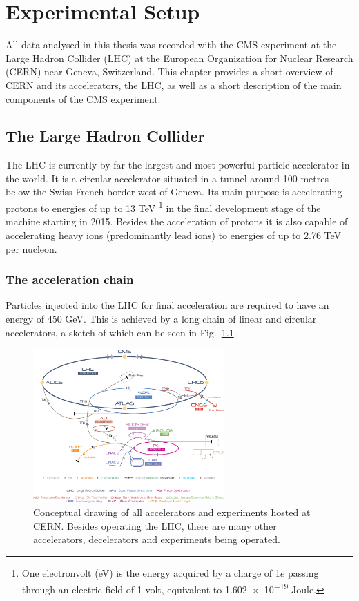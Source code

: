 \chapter{Experimental Setup}
\label{ch:exp}

All data analysed in this thesis was recorded with the CMS experiment at the Large Hadron
Collider (LHC) at the European Organization for Nuclear Research (CERN) near Geneva, Switzerland.
This chapter provides a short overview of CERN and its accelerators, the LHC, as well as a
short description of the main components of the CMS experiment.

\section{The Large Hadron Collider}
\label{sec:lhc}
The LHC \cite{lhc_designreport} is currently by far the largest and most powerful particle accelerator in
the world. It is a circular accelerator situated in a tunnel around 100 metres below the Swiss-French
border west of Geneva. Its main purpose is accelerating protons to energies of up to 13 TeV
\footnote{One electronvolt (eV) is the energy acquired by a charge of 1$e$ passing through an electric field of 1 volt, equivalent to \num{1.602e-19} Joule.} 
in the final development stage of the machine starting in 2015. 
Besides the acceleration of protons it is also capable of accelerating heavy ions (predominantly lead ions) to energies of up to 
2.76 TeV per nucleon.

\subsection{The acceleration chain}
\label{sub:chain}
Particles injected into the LHC for final acceleration are required to have an energy of 450 GeV. This is
achieved by a long chain of linear and circular accelerators, a sketch of which can be seen in
Fig.~\ref{fig:accelerators}. 

\begin{figure}[h!]
    \centering
    \includegraphics[width=0.65\textwidth]{../figs/Cern-Accelerator-Complex.jpg}
    \caption{Conceptual drawing of all accelerators and experiments hosted at CERN. Besides operating
    the LHC, there are many other accelerators, decelerators and experiments being operated.}
    \label{fig:accelerators}
\end{figure}

